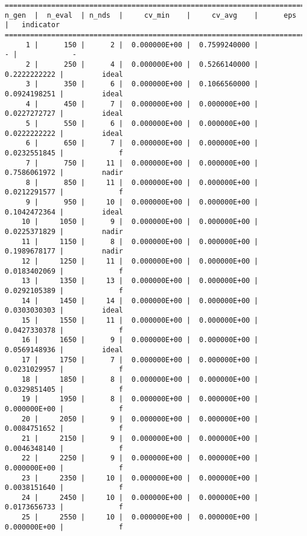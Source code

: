 \documentclass[
  letterpaper,
  DIV=11,
  numbers=noendperiod]{scrartcl}
\begin{document}
\begin{verbatim}
==========================================================================================
n_gen  |  n_eval  | n_nds  |     cv_min    |     cv_avg    |      eps      |   indicator  
==========================================================================================
     1 |      150 |      2 |  0.000000E+00 |  0.7599240000 |             - |             -
     2 |      250 |      4 |  0.000000E+00 |  0.5266140000 |  0.2222222222 |         ideal
     3 |      350 |      6 |  0.000000E+00 |  0.1066560000 |  0.0924198251 |         ideal
     4 |      450 |      7 |  0.000000E+00 |  0.000000E+00 |  0.0227272727 |         ideal
     5 |      550 |      6 |  0.000000E+00 |  0.000000E+00 |  0.0222222222 |         ideal
     6 |      650 |      7 |  0.000000E+00 |  0.000000E+00 |  0.0232551845 |             f
     7 |      750 |     11 |  0.000000E+00 |  0.000000E+00 |  0.7586061972 |         nadir
     8 |      850 |     11 |  0.000000E+00 |  0.000000E+00 |  0.0212291577 |             f
     9 |      950 |     10 |  0.000000E+00 |  0.000000E+00 |  0.1042472364 |         ideal
    10 |     1050 |      9 |  0.000000E+00 |  0.000000E+00 |  0.0225371829 |         nadir
    11 |     1150 |      8 |  0.000000E+00 |  0.000000E+00 |  0.1989678177 |         nadir
    12 |     1250 |     11 |  0.000000E+00 |  0.000000E+00 |  0.0183402069 |             f
    13 |     1350 |     13 |  0.000000E+00 |  0.000000E+00 |  0.0292105389 |             f
    14 |     1450 |     14 |  0.000000E+00 |  0.000000E+00 |  0.0303030303 |         ideal
    15 |     1550 |     11 |  0.000000E+00 |  0.000000E+00 |  0.0427330378 |             f
    16 |     1650 |      9 |  0.000000E+00 |  0.000000E+00 |  0.0569148936 |         ideal
    17 |     1750 |      7 |  0.000000E+00 |  0.000000E+00 |  0.0231029957 |             f
    18 |     1850 |      8 |  0.000000E+00 |  0.000000E+00 |  0.0329851405 |             f
    19 |     1950 |      8 |  0.000000E+00 |  0.000000E+00 |  0.000000E+00 |             f
    20 |     2050 |      9 |  0.000000E+00 |  0.000000E+00 |  0.0084751652 |             f
    21 |     2150 |      9 |  0.000000E+00 |  0.000000E+00 |  0.0046348140 |             f
    22 |     2250 |      9 |  0.000000E+00 |  0.000000E+00 |  0.000000E+00 |             f
    23 |     2350 |     10 |  0.000000E+00 |  0.000000E+00 |  0.0038151640 |             f
    24 |     2450 |     10 |  0.000000E+00 |  0.000000E+00 |  0.0173656733 |             f
    25 |     2550 |     10 |  0.000000E+00 |  0.000000E+00 |  0.000000E+00 |             f

\end{verbatim}
\end{document}

